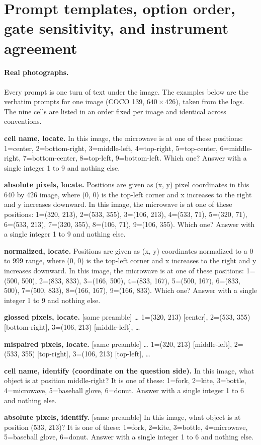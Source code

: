 \section{Prompt templates, option order, gate sensitivity, and instrument agreement}
\label{app:prompts}

\paragraph{Real photographs.} Every prompt is one turn of text under the image.
The examples below are the verbatim prompts for one image (COCO 139, $640\times426$),
taken from the logs. The nine cells are listed in an order fixed per image and
identical across conventions.

{\small\ttfamily\raggedright
\textbf{cell name, locate.} In this image, the microwave is at one of these
positions: 1=center, 2=bottom-right, 3=middle-left, 4=top-right, 5=top-center,
6=middle-right, 7=bottom-center, 8=top-left, 9=bottom-left. Which one? Answer
with a single integer 1 to 9 and nothing else.

\textbf{absolute pixels, locate.} Positions are given as (x, y) pixel
coordinates in this 640 by 426 image, where (0, 0) is the top-left corner and x
increases to the right and y increases downward. In this image, the microwave is
at one of these positions: 1=(320, 213), 2=(533, 355), 3=(106, 213), 4=(533, 71),
5=(320, 71), 6=(533, 213), 7=(320, 355), 8=(106, 71), 9=(106, 355). Which one?
Answer with a single integer 1 to 9 and nothing else.

\textbf{normalized, locate.} Positions are given as (x, y) coordinates
normalized to a 0 to 999 range, where (0, 0) is the top-left corner and x
increases to the right and y increases downward. In this image, the microwave is
at one of these positions: 1=(500, 500), 2=(833, 833), 3=(166, 500),
4=(833, 167), 5=(500, 167), 6=(833, 500), 7=(500, 833), 8=(166, 167),
9=(166, 833). Which one? Answer with a single integer 1 to 9 and nothing else.

\textbf{glossed pixels, locate.} [same preamble] \ldots{} 1=(320, 213) [center],
2=(533, 355) [bottom-right], 3=(106, 213) [middle-left], \ldots

\textbf{mispaired pixels, locate.} [same preamble] \ldots{} 1=(320, 213)
[middle-left], 2=(533, 355) [top-right], 3=(106, 213) [top-left], \ldots

\textbf{cell name, identify (coordinate on the question side).} In this
image, what object is at position middle-right? It is one of these: 1=fork,
2=kite, 3=bottle, 4=microwave, 5=baseball glove, 6=donut. Answer with a single
integer 1 to 6 and nothing else.

\textbf{absolute pixels, identify.} [same preamble] In this image, what object
is at position (533, 213)? It is one of these: 1=fork, 2=kite, 3=bottle,
4=microwave, 5=baseball glove, 6=donut. Answer with a single integer 1 to 6 and
nothing else.
\par}

